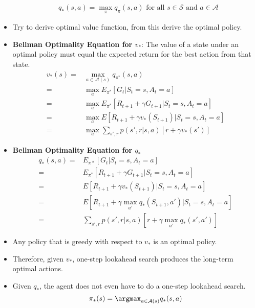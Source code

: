 \documentclass[a4paper]{article}
\begin{document}
\begin{itemize}
\begin{equation*}
\begin{split}
            &q_{*}(s,a)=\max_\pi q_\pi(s,a)\text{ for all }s\in \mathcal{S}\text{ and }a\in \mathcal{A}
        \end{split}
    \end{equation*}
    \item Try to derive optimal value function, from this derive the optimal policy.
    \item \textbf{Bellman Optimality Equation for $v_*$}: The value of a state under an optimal policy must equal the expected return for the best action from that state.
    \begin{equation*}
        \begin{split}
            v_*(s)=&\max_{a\in \mathcal{A}(s)}q_{\pi^*}(s,a)\\
            =&\max_aE_{\pi^*}[G_t|S_t=s,A_t=a]\\
            =&\max_aE_{\pi^*}[R_{t+1}+\gamma G_{t+1}|S_t=s,A_t=a]\\
            =&\max_aE[R_{t+1}+\gamma v_*(S_{t+1})|S_t=s,A_t=a]\\
            =&\max_a\sum_{s',r}p(s',r|s,a)[r+\gamma v_*(s')]
        \end{split}
    \end{equation*}
    \item \textbf{Bellman Optimality Equation for $q_*$}
    \begin{equation*}
        \begin{split}
            q_*(s,a)=&E_{\pi*}[G_t|S_t=s,A_t=a]\\
            =&E_{\pi^*}[R_{t+1}+\gamma G_{t+1}|S_t=s,A_t=a]\\
            =&E[R_{t+1}+\gamma v_*(S_{t+1})|S_t=s,A_t=a]\\
            =&E[R_{t+1}+\gamma \max_{a'}q_*(S_{t+1},a')|S_t=s,A_t=a]\\
            =&\sum_{s',r}p(s',r|s,a)[r+\gamma \max_{a'}q_*(s',a')]
        \end{split}
    \end{equation*}
    \item Any policy that is greedy with respect to $v_*$ is an optimal policy.
    \item Therefore, given $v_*$, one-step lookahead search produces the long-term optimal actions.
    \item Given $q_*$, the agent does not even have to do a one-step lookahead search.
    \begin{equation*}
        \pi_*(s)=\argmax_{a\in \mathcal{A}(s)}q_*(s,a)
    \end{equation*}
\end{itemize}
\end{document}
